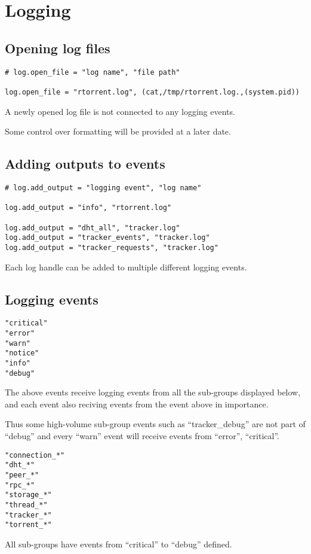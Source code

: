 \section{Logging}

\subsection{Opening log files}

\begin{verbatim}
# log.open_file = "log name", "file path"

log.open_file = "rtorrent.log", (cat,/tmp/rtorrent.log.,(system.pid))
\end{verbatim}

A newly opened log file is not connected to any logging events.

Some control over formatting will be provided at a later date.


\subsection{Adding outputs to events}

\begin{verbatim}
# log.add_output = "logging event", "log name"

log.add_output = "info", "rtorrent.log"

log.add_output = "dht_all", "tracker.log"
log.add_output = "tracker_events", "tracker.log"
log.add_output = "tracker_requests", "tracker.log"
\end{verbatim}

Each log handle can be added to multiple different logging events.


\subsection{Logging events}

\begin{verbatim}
"critical"
"error"
"warn"
"notice"
"info"
"debug"
\end{verbatim}

The above events receive logging events from all the sub-groups
displayed below, and each event also reciving events from the event
above in importance.

Thus some high-volume sub-group events such as ``tracker\_debug'' are
not part of ``debug'' and every ``warn'' event will receive events
from ``error'', ``critical''.

\begin{verbatim}
"connection_*"
"dht_*"
"peer_*"
"rpc_*"
"storage_*"
"thread_*"
"tracker_*"
"torrent_*"
\end{verbatim}

All sub-groups have events from ``critical'' to ``debug'' defined.

